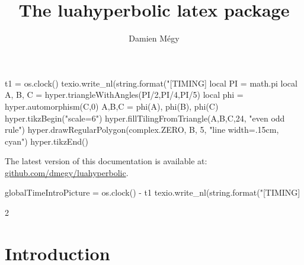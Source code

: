 \documentclass{article}
\title{The \textbf{\textsf{luahyperbolic}} latex package}
\author{Damien Mégy}
\date{}
\begin{document}
\maketitle
\begin{center}
\begin{luacode*}
t1 = os.clock()
texio.write_nl(string.format("[TIMING]  %
local PI = math.pi
local A, B, C = hyper.triangleWithAngles(PI/2,PI/4,PI/5)
local phi = hyper.automorphism(C,0)
A,B,C = phi(A), phi(B), phi(C)
hyper.tikzBegin("scale=6")
hyper.fillTilingFromTriangle(A,B,C,24, "even odd rule")
hyper.drawRegularPolygon(complex.ZERO, B, 5,  "line width=.15cm, cyan")
hyper.tikzEnd()
\end{luacode*}
\par
\bigskip
The latest version of this documentation is available at:
\href{https://github.com/dmegy/luahyperbolic}{github.com/dmegy/luahyperbolic}.
\end{center}

\begin{luacode*}
globalTimeIntroPicture = os.clock() - t1
texio.write_nl(string.format("[TIMING] %
\end{luacode*}
\vspace{1cm}
\begin{multicols}{2}
\setcounter{tocdepth}{2}
\tableofcontents
\end{multicols}



\newpage
\section{Introduction}
\end{document}

